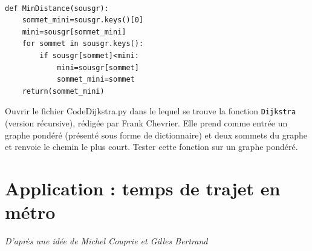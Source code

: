 \begin{solution}~\
\begin{verbatim}
def MinDistance(sousgr):
    sommet_mini=sousgr.keys()[0]
    mini=sousgr[sommet_mini]
    for sommet in sousgr.keys():
        if sousgr[sommet]<mini:
            mini=sousgr[sommet]
            sommet_mini=sommet
    return(sommet_mini) 
\end{verbatim}
\end{solution}



\begin{exercice}
Ouvrir le fichier CodeDijkstra.py dans le lequel se trouve la fonction \texttt{Dijkstra} (version récursive), rédigée par Frank Chevrier. Elle prend comme entrée un graphe pondéré (présenté sous forme de dictionnaire) et deux sommets du graphe et renvoie le chemin le plus court. Tester cette fonction sur un graphe pondéré.
\end{exercice}

\begin{solution}

\end{solution}


\section{Application : temps de trajet en métro}

\textit{D'après une idée de Michel Couprie et Gilles Bertrand}

